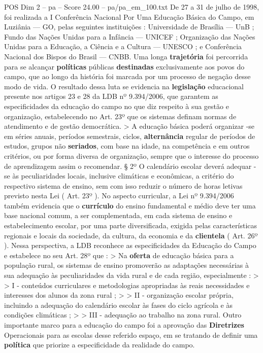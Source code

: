 \begin{textsample}{POS Dim 2 – pa – Score 24.00 – pa/pa\_em\_100.txt}
De 27 a 31 de julho de 1998, foi realizada a I Conferência Nacional Por Uma Educação Básica do Campo, em Luziânia — GO, pelas seguintes instituições : Universidade de Brasília — UnB ; Fundo das Nações Unidas para a Infância — UNICEF ; Organização das Nações Unidas para a Educação, a Ciência e a Cultura — UNESCO ; e Conferência Nacional dos Bispos do Brasil — CNBB.
Uma longa \textbf{trajetória} foi percorrida para se alcançar \textbf{políticas} públicas \textbf{destinadas} exclusivamente aos povos do campo, que ao longo da história foi marcada por um processo de negação desse modo de vida.
O resultado dessa luta se evidencia na \textbf{legislação} educacional presente nos artigos 23 e 28 da LDB nº 9.394/2006, que garantem as especificidades da educação do campo no que diz respeito à sua gestão e organização, estabelecendo no Art. 23º que os sistemas definam normas de atendimento e de gestão democrática. > A educação básica poderá organizar -se em séries anuais, períodos semestrais, ciclos, \textbf{alternância} regular de períodos de estudos, grupos não \textbf{seriados}, com base na idade, na competência e em outros critérios, ou por forma diversa de organização, sempre que o interesse do processo de aprendizagem assim o recomendar. § 2º O calendário escolar deverá adequar -se às peculiaridades locais, inclusive climáticas e econômicas, a critério do respectivo sistema de ensino, sem com isso reduzir o número de horas letivas previsto nesta Lei ( Art. 23º ).
No aspecto curricular, a Lei nº 9.394/2006 também evidencia que o \textbf{currículo} do ensino fundamental e médio deve ter uma base nacional comum, a ser complementada, em cada sistema de ensino e estabelecimento escolar, por uma parte diversificada, exigida pelas características regionais e locais da sociedade, da cultura, da economia e da \textbf{clientela} ( Art. 26º ).
Nessa perspectiva, a LDB reconhece as especificidades da Educação do Campo e estabelece no seu Art. 28º que : > Na \textbf{oferta} de educação básica para a população rural, os sistemas de ensino promoverão as adaptações necessárias à sua adequação às peculiaridades da vida rural e de cada região, especialmente : > > I - conteúdos curriculares e metodologias apropriadas às reais necessidades e interesses dos alunos da zona rural ; > > II - organização escolar própria, incluindo a adequação do calendário escolar às fases do ciclo agrícola e às condições climáticas ; > > III - adequação ao trabalho na zona rural.
Outro importante marco para a educação do campo foi a aprovação das \textbf{Diretrizes} Operacionais para as escolas desse referido espaço, em se tratando de definir uma \textbf{política} que priorize a especificidade da realidade do campo.

\end{textsample}
